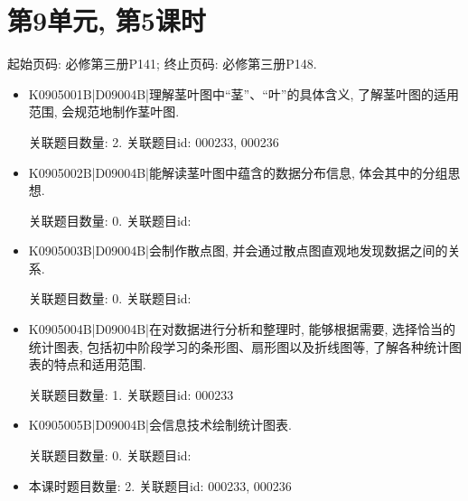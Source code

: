 \section*{第9单元, 第5课时}
起始页码: 必修第三册P141; 终止页码: 必修第三册P148.
\begin{itemize}
\item K0905001B|D09004B|理解茎叶图中``茎''、``叶''的具体含义, 了解茎叶图的适用范围, 会规范地制作茎叶图.

关联题目数量: 2. 关联题目id: 000233, 000236

\item K0905002B|D09004B|能解读茎叶图中蕴含的数据分布信息, 体会其中的分组思想.

关联题目数量: 0. 关联题目id: 

\item K0905003B|D09004B|会制作散点图, 并会通过散点图直观地发现数据之间的关系.

关联题目数量: 0. 关联题目id: 

\item K0905004B|D09004B|在对数据进行分析和整理时, 能够根据需要, 选择恰当的统计图表, 包括初中阶段学习的条形图、扇形图以及折线图等, 了解各种统计图表的特点和适用范围.

关联题目数量: 1. 关联题目id: 000233

\item K0905005B|D09004B|会信息技术绘制统计图表.

关联题目数量: 0. 关联题目id: 

\item 本课时题目数量: 2. 关联题目id: 000233, 000236

\end{itemize}

